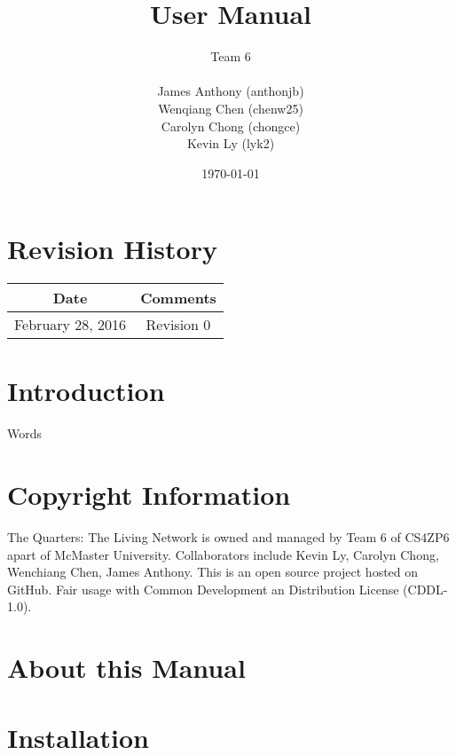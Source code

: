 \documentclass[12pt]{article}
\begin{document}
\title{User Manual}
\author{Team 6\\ \\James Anthony (anthonjb)\\ Wenqiang Chen (chenw25)\\ Carolyn Chong
(chongce)\\ Kevin Ly (lyk2)}
\date{\today}

\maketitle

\pagebreak

\tableofcontents
\listoffigures

\section*{Revision History}
\begin{tabular}{|c|c|}
\hline
\textbf{Date}  & \textbf{Comments} \\ \hline
February 28, 2016 & Revision 0 \\ \hline
\end{tabular}

\pagebreak


\section{Introduction}

Words

\section{Copyright Information}
The Quarters: The Living Network is owned and managed by Team 6 of CS4ZP6 apart of McMaster University.
 Collaborators include Kevin Ly, Carolyn Chong, Wenchiang Chen, James Anthony. This is an open source
 project hosted on GitHub. Fair usage with Common Development an Distribution License (CDDL-1.0).

\section{About this Manual}

\section{Installation}
\end{document}

